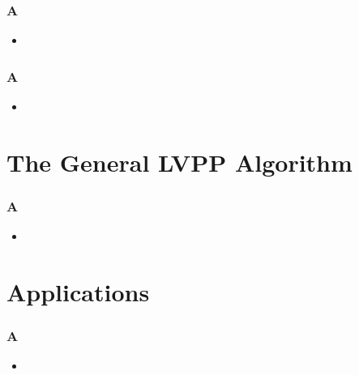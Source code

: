\documentclass[aspectratio=169,xcolor=dvipsnames,11pt]{beamer}
\begin{document}
\begin{frame}\frametitle{A}
\begin{itemize}
\item
\end{itemize}
\end{frame}

\begin{frame}\frametitle{A}
\begin{itemize}
\item
\end{itemize}
\end{frame}

\section{The General LVPP Algorithm}
\begin{frame}\frametitle{A}
\begin{itemize}
\item
\end{itemize}
\end{frame}

\section{Applications}
\begin{frame}\frametitle{A}
\begin{itemize}
\item
\end{itemize}
\end{frame}
\end{document}
